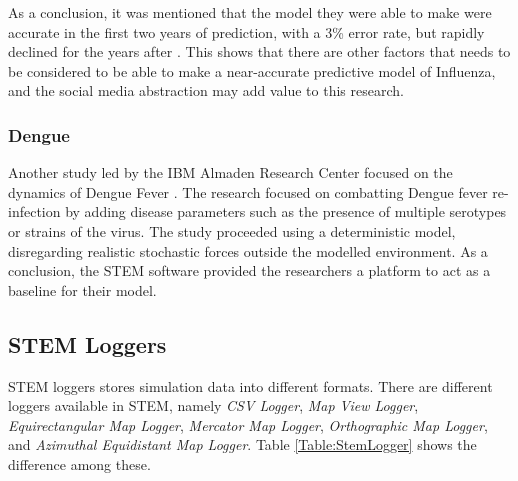 As a conclusion, it was mentioned that the model they were able to make were accurate in the first two years of prediction, with a 3\% error rate, but rapidly declined for the years after \cite{edlund2009spatiotemporal}. This shows that there are other factors that needs to be considered to be able to make a near-accurate predictive model of Influenza, and the social media abstraction may add value to this research.

\subsubsection{Dengue}
Another study led by the IBM Almaden Research Center focused on the dynamics of Dengue Fever \cite{hu2013modeling}. The research focused on combatting Dengue fever re-infection by adding disease parameters such as the presence of multiple serotypes or strains of the virus. The study proceeded using a deterministic model, disregarding realistic stochastic forces outside the modelled environment. As a conclusion, the STEM software provided the researchers a platform to act as a baseline for their model.


\subsection{STEM Loggers}

STEM loggers stores simulation data into different formats. There are different loggers available in STEM, namely \textit{CSV Logger}, \textit{Map View Logger}, \textit{Equirectangular Map Logger}, \textit{Mercator Map Logger}, \textit{Orthographic Map Logger}, and \textit{Azimuthal Equidistant Map Logger}. Table \ref{Table:StemLogger} shows the difference among these.


